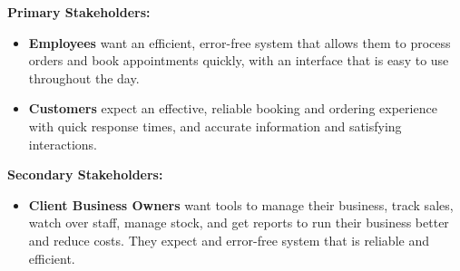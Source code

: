 \documentclass[]{VUMIFTemplateClass}
\begin{document}






\textbf{Primary Stakeholders:}
\begin{itemize}

    \item \textbf{Employees} want an efficient, error-free system that allows them to process orders and book appointments quickly, with an interface that is easy to use throughout the day.
    \item \textbf{Customers} expect an effective, reliable booking and ordering
    experience with quick response times, and accurate information and
    satisfying interactions.
\end{itemize}

\textbf{Secondary Stakeholders:}
\begin{itemize}
    \item \textbf{Client Business Owners} want tools to manage their business,
    track sales, watch over staff, manage stock, and get reports to run their
    business better and reduce costs. They expect and error-free system that is
    reliable and efficient. 
\end{itemize}
\end{document}
